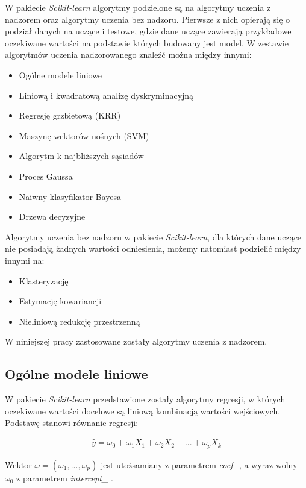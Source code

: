 W pakiecie \textit{Scikit-learn} algorytmy podzielone są na algorytmy uczenia z nadzorem oraz algorytmy uczenia bez nadzoru\cite{scikit_doc}.
Pierwsze z nich opierają się o podział danych na uczące i testowe, gdzie dane uczące zawierają przykładowe oczekiwane wartości na podstawie których budowany jest model.
W zestawie algorytmów uczenia nadzorowanego znaleźć można między innymi\cite{scikit_doc}:
\begin{itemize}
 \item Ogólne modele liniowe
 \item Liniową i kwadratową analizę dyskryminacyjną
 \item Regresję grzbietową (KRR)
 \item Maszynę wektorów nośnych (SVM)
 \item Algorytm k najbliższych sąsiadów
 \item Proces Gaussa
 \item Naiwny klasyfikator Bayesa
 \item Drzewa decyzyjne\\
\end{itemize}

Algorytmy uczenia bez nadzoru w pakiecie \textit{Scikit-learn}, dla których dane uczące nie posiadają żadnych wartości odniesienia, możemy natomiast podzielić między innymi na:
\begin{itemize}
 \item Klasteryzację
 \item Estymację kowariancji
 \item Nieliniową redukcję przestrzenną\\
\end{itemize}

W niniejszej pracy zastosowane zostały algorytmy uczenia z nadzorem.

\subsection{Ogólne modele liniowe}
W pakiecie \textit{Scikit-learn} przedstawione zostały algorytmy regresji, w których oczekiwane wartości docelowe są liniową kombinacją wartości wejściowych.
Podstawę stanowi równanie regresji:
\begin{ceqn}
\begin{align}
\hat{y} = \omega_{0} + \omega_{1}X_{1} + \omega_{2}X_{2} + ... + \omega_{p}X_{k}
\end{align}
\end{ceqn}

Wektor $\omega = (\omega_{1}, ..., \omega_{p})$ jest utożsamiany z parametrem \textit{coef\_}, a wyraz wolny $\omega_{0}$ z parametrem \textit{intercept\_} \cite{scikit_doc}.\\

